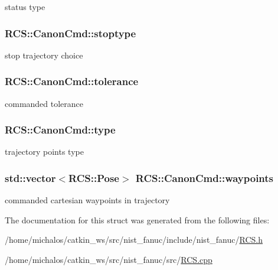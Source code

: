 status type \hypertarget{structRCS_1_1CanonCmd_a22bc418b884c7afabf0a2d3538f74cad}{
\subsubsection[{stoptype}]{ R\-C\-S\-::\-Canon\-Cmd\-::stoptype}}\label{structRCS_1_1CanonCmd_a22bc418b884c7afabf0a2d3538f74cad}
stop trajectory choice \hypertarget{structRCS_1_1CanonCmd_a0ae62df775329f52054c5cb25d0845a9}{
\subsubsection[{tolerance}]{ R\-C\-S\-::\-Canon\-Cmd\-::tolerance}}\label{structRCS_1_1CanonCmd_a0ae62df775329f52054c5cb25d0845a9}
commanded tolerance \hypertarget{structRCS_1_1CanonCmd_abf1d51c90a3f1b4c5796292c53cbde01}{
\subsubsection[{type}]{ R\-C\-S\-::\-Canon\-Cmd\-::type}}\label{structRCS_1_1CanonCmd_abf1d51c90a3f1b4c5796292c53cbde01}
trajectory points type \hypertarget{structRCS_1_1CanonCmd_a1f7fdffabe34bcb3f0afd42f60040648}{
\subsubsection[{waypoints}]{\setlength{\rightskip}{0pt plus 5cm}std\-::vector$<${\bf R\-C\-S\-::\-Pose}$>$ R\-C\-S\-::\-Canon\-Cmd\-::waypoints}}\label{structRCS_1_1CanonCmd_a1f7fdffabe34bcb3f0afd42f60040648}
commanded cartesian waypoints in trajectory 

The documentation for this struct was generated from the following files\-:\begin{DoxyCompactItemize}
\item 
/home/michalos/catkin\-\_\-ws/src/nist\-\_\-fanuc/include/nist\-\_\-fanuc/\hyperlink{RCS_8h}{R\-C\-S.\-h}\item 
/home/michalos/catkin\-\_\-ws/src/nist\-\_\-fanuc/src/\hyperlink{RCS_8cpp}{R\-C\-S.\-cpp}\end{DoxyCompactItemize}
